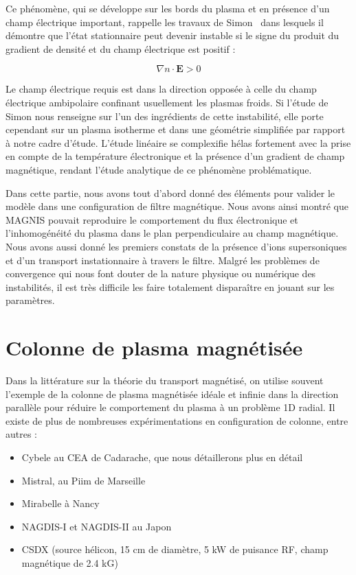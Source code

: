 \begin{refsection}
	Ce phénomène, qui se développe sur les bords du plasma et
	en présence d'un champ électrique important, rappelle
	les travaux de Simon~\parencite{Simon63} dans lesquels il démontre que l'état
	stationnaire peut devenir instable si le signe du produit du
	gradient de densité et du champ électrique est positif :
	
	\begin{equation}
		\nabla n\cdot \mathbf E>0
	\end{equation}
	
	Le champ électrique requis est dans la direction opposée à celle du champ
	électrique ambipolaire confinant usuellement les plasmas froids. Si l'étude de
	Simon nous renseigne sur l'un des ingrédients de cette instabilité, elle porte
	cependant sur un plasma isotherme et dans une géométrie simplifiée par rapport
	à notre cadre d'étude. L'étude linéaire se complexifie hélas fortement avec la
	prise en compte de la température électronique et la présence d'un gradient
	de champ magnétique, rendant l'étude analytique de ce phénomène problématique.

	Dans cette partie, nous avons tout d'abord donné des éléments pour
	valider le modèle dans une configuration de filtre magnétique. Nous avons ainsi
	montré que MAGNIS pouvait reproduire le comportement du flux électronique et
	l'inhomogénéité du plasma dans le plan perpendiculaire au champ
	magnétique. Nous avons aussi donné les premiers constats de la présence d'ions
	supersoniques et d'un transport instationnaire à travers le filtre.
	Malgré les problèmes de convergence qui nous font douter de la nature physique
	ou numérique des instabilités, il est très difficile les faire
	totalement disparaître en jouant sur les paramètres.
	
\section{Colonne de plasma magnétisée}
Dans la littérature sur la théorie du transport magnétisé, on utilise
souvent l'exemple de la colonne de plasma magnétisée idéale et infinie dans la
direction parallèle pour réduire le comportement du plasma à un problème 1D
radial. Il existe de plus de nombreuses expérimentations en
configuration de colonne, entre autres :

\begin{itemize}
  \item Cybele au CEA de Cadarache, que nous détaillerons plus en détail
  \item Mistral, au Piim de
  Marseille\parencite{Pierre, PierreExp, Brochard, Oldenburger}
  \item Mirabelle à Nancy~\parencite{Bousselin}
  \item NAGDIS-I et NAGDIS-II au Japon~\parencite{nishijimamodelling}
  \item CSDX (source hélicon, 15 cm de diamètre, 5 kW de puisance RF, champ
  magnétique de 2.4 kG)~\parencite{CSDX}
 \end{itemize}


\end{refsection}
